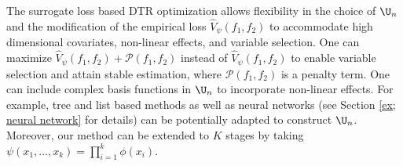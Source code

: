 \documentclass[preprint] {imsart}
\begin{document}
The surrogate loss based DTR optimization allows flexibility in the choice of $\U_n$ and the modification of the empirical loss $\widehat V_\psi(f_1,f_2)$ to accommodate high dimensional covariates, non-linear effects, and variable selection. 
 One can maximize $\widehat V_\psi(f_1,f_2)+\mathcal P(f_1,f_2)$ instead of $\widehat V_\psi(f_1,f_2)$ to enable variable selection and attain stable estimation, where $\mathcal P(f_1,f_2)$ is a penalty term. One can include complex basis functions in $\U_n$ to incorporate non-linear effects. %
 For example, tree and list based methods \citep{zhang2018interpretable, sun2021stochastic,laber2015tree} {\color{black} as well\label{page: missing REF} as neural networks (see Section \ref{ex; neural network} for details) can be potentially adapted to construct $\U_n$.} %
 Moreover, our method can be extended to $K$ stages by taking $\psi(x_1,\ldots,x_k)=\prod_{i=1}^k \phi(x_i)$.
 
 
\end{document}
